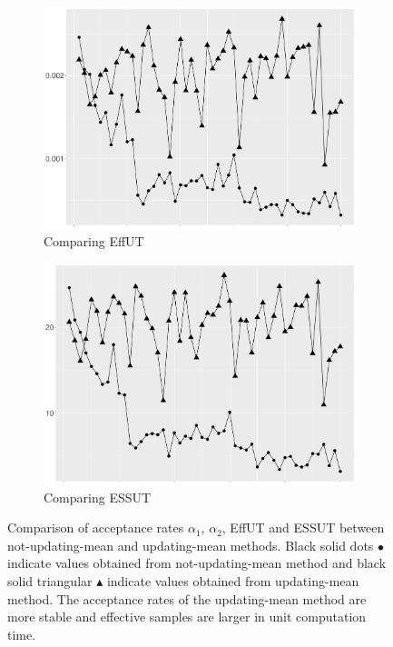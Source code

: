 \begin{figure}[h]
\begin{subfigure}[t]{0.45\textwidth}
\includegraphics[width=\textwidth]{Chapters/05MCMCOU/plots/realdatacompareeffutnotupandup2.pdf}
   \caption{Comparing EffUT}
\end{subfigure}
\begin{subfigure}[t]{0.45\textwidth}
\includegraphics[width=\textwidth]{Chapters/05MCMCOU/plots/realdatacompareessutnotupandup2.pdf}
   \caption{Comparing ESSUT}
\end{subfigure}
\caption{Comparison of acceptance rates $\alpha_1$, $\alpha_2$, EffUT and ESSUT between not-updating-mean and updating-mean methods. Black solid dots $\bullet$ indicate values obtained from not-updating-mean method and black solid triangular $\blacktriangle$ indicate values obtained from updating-mean method. The acceptance rates of the updating-mean method are more stable and effective samples are larger in unit computation time. }\label{comparenotanupfeatures}
\end{figure}


